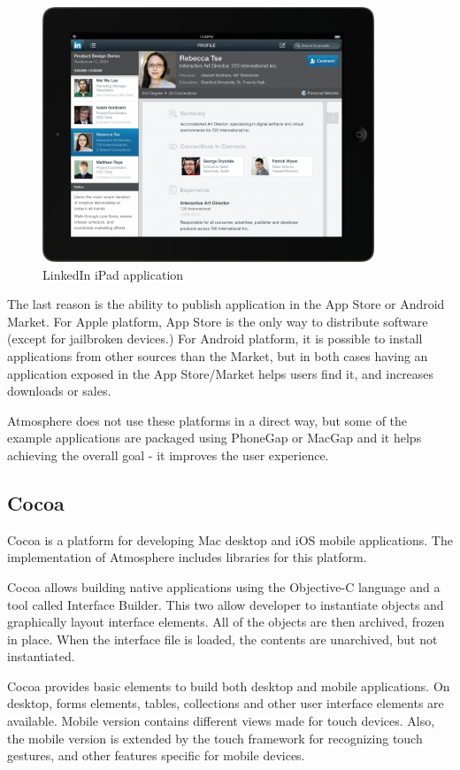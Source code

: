 \begin{figure}[htbp]
  \centering
    \includegraphics[height=3in]{figures/LinkedIn_iPad.jpg}
  \caption{LinkedIn iPad application}
  \label{fig:linkedin}
\end{figure}

The last reason is the ability to publish application in the App Store or Android Market. For Apple platform, App Store is the only way to distribute software (except for jailbroken devices.) For Android platform, it is possible to install applications from other sources than the Market, but in both cases having an application exposed in the App Store/Market helps users find it, and increases downloads or sales.

Atmosphere does not use these platforms in a direct way, but some of the example applications are packaged using PhoneGap or MacGap and it helps achieving the overall goal - it improves the user experience.

\subsection{Cocoa}

Cocoa is a platform for developing Mac desktop and iOS mobile applications. The implementation of Atmosphere includes libraries for this platform.

Cocoa allows building native applications using the Objective-C language and a tool called Interface Builder. \citep{cocoa_hilegass} This two allow developer to instantiate objects and graphically layout interface elements. All of the objects are then archived, frozen in place. When the interface file is loaded, the contents are unarchived, but not instantiated.

Cocoa provides basic elements to build both desktop and mobile applications. On desktop, forms elements, tables, collections and other user interface elements are available. Mobile version contains different views made for touch devices. Also, the mobile version is extended by the touch framework for recognizing touch gestures, and other features specific for mobile devices.

